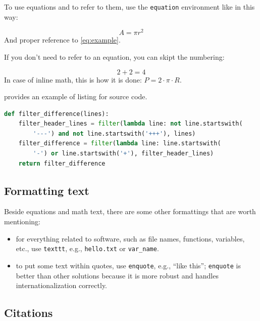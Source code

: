 To use equations and to refer to them, use the \texttt{equation} environment like in this way:

\begin{equation}
\label{eq:example}
A = \pi r^2
\end{equation}
%
And proper reference to \cref{eq:example}.

If you don't need to refer to an equation, you can skipt the numbering:

\[
2 + 2 = 4
\]
%
In case of inline math, this is how it is done: $P = 2 \cdot \pi \cdot R$.

 provides an example of listing for source code.

\begin{lstlisting}[language=Python,
caption={Example of listing.},
label={lst:example-listing},
float=tp]
def filter_difference(lines):
    filter_header_lines = filter(lambda line: not line.startswith(
        '---') and not line.startswith('+++'), lines)
    filter_difference = filter(lambda line: line.startswith(
        '-') or line.startswith('+'), filter_header_lines)
    return filter_difference
\end{lstlisting}


\subsection{Formatting text}

Beside equations and math text, there are some other formattings that are worth mentioning:

\begin{itemize}
\item for everything related to software, such as file names, functions, variables, etc., use \texttt{texttt}, e.g., \texttt{hello.txt} or \texttt{var\_name}.
\item to put some text within quotes, use \texttt{enquote}, e.g., \enquote{like this}; \texttt{enquote} is better than other solutions because it is more robust and handles internationalization correctly.
\end{itemize}

\subsection{Citations}


